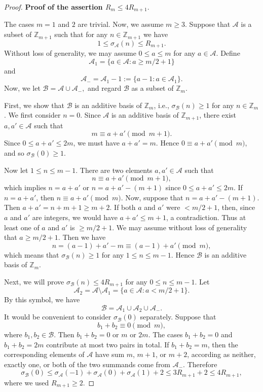 \documentclass[10pt,a4paper]{amsart}
\begin{document}
\begin{proof}
\medskip

{\bf Proof of the assertion $R_{m}\le 4R_{m+1}$}. 

The cases $m=1$ and $2$ are trivial. Now, we assume $m\ge 3$.
Suppose that $\mathcal{A}$ is a subset of $\mathbb{Z}_{m+1}$ such that for any $n\in \mathbb{Z}_{m+1}$ we have
 $$
 1\le \sigma_{\mathcal{A}}(n)\le R_{m+1}.
 $$
Without loss of generality, we may assume $0\le a\le m$ for any $a\in \mathcal{A}$. Define
$$
\mathcal{A}_{1}=\big\{a\in \mathcal{A}: a\ge m/2+1\big\}
$$
and
$$
\mathcal{A}_{-}=\mathcal{A}_{1}-1:=\{a-1: a\in \mathcal{A}_{1}\}.
$$
Now, we let
$
\mathcal{B}=\mathcal{A}\cup \mathcal{A}_{-},
$
and regard $\mathcal{B}$ as a subset of $\mathbb{Z}_{m}$.

First, we show that $\mathcal{B}$ is an additive basis of $\mathbb{Z}_{m}$, i.e., $\sigma_{\mathcal{B}}(n)\ge 1$ for any $n\in \mathbb{Z}_{m}$. We first consider $n=0$. Since $\mathcal A$ is an additive basis of $\mathbb Z_{m+1}$, there exist $a,a'\in\mathcal A$ such that
$$
m\equiv a+a'\pmod{m+1}.
$$
Since $0\le a+a'\le 2m$, we must have $a+a'=m$. Hence $0\equiv a+a'\pmod m$, and so $\sigma_{\mathcal B}(0)\ge1$.

Now let $1\le n\le m-1$. There are two elements $a, a'\in \mathcal{A}$ such that
$$
n\equiv a+a'\pmod{m+1},
$$
which implies $n=a+a'$ or $n=a+a'-(m+1)$ since $0\le a+a'\le 2m$. If $n=a+a'$, then 
$
n\equiv a+a'\pmod{m}.
$
Now, suppose that $n=a+a'-(m+1)$. Then $a+a'=n+m+1\ge m+2$. If both $a$ and $a'$ were $<m/2+1$, then, since $a$ and $a'$ are integers, we would have $a+a'\le m+1$, a contradiction. Thus at least one of $a$ and $a'$ is $\ge m/2+1$. We may assume without loss of generality that $a\ge m/2+1$. Then we have
$$
n=(a-1)+a'-m\equiv (a-1)+a'\pmod{m},
$$
which means that $\sigma_{\mathcal{B}}(n)\ge 1$ for any $1\le n\le m-1$. Hence $\mathcal B$ is an additive basis of $\mathbb Z_m$.

Next, we will prove $\sigma_{\mathcal{B}}(n)\le 4R_{m+1}$ for any $0\le n\le m-1$. Let
$$
\mathcal{A}_{2}=\mathcal{A}\setminus\mathcal{A}_1=\big\{a\in \mathcal{A}: a< m/2+1\big\}.
$$
By this symbol, we have
$$
\mathcal{B}=\mathcal{A}_1\cup \mathcal{A}_{2}\cup\mathcal{A}_{-}.
$$
It would be convenient to consider $\sigma_{\mathcal{B}}(0)$ separately. Suppose that
$$
b_1+b_2\equiv 0\pmod{m},
$$
where $b_1,b_2\in\mathcal B$. Then $b_1+b_2=0$ or $m$ or $2m$. The cases $b_1+b_2=0$ and $b_1+b_2=2m$ contribute at most two pairs in total. If $b_1+b_2=m$, then the corresponding elements of $\mathcal A$ have sum $m$, $m+1$, or $m+2$, according as neither, exactly one, or both of the two summands come from $\mathcal A_-$. Therefore
$$
\sigma_{\mathcal{B}}(0)\le \sigma_{\mathcal{A}}(-1)+\sigma_{\mathcal{A}}(0)+\sigma_{\mathcal{A}}(1)+2\le 3R_{m+1}+2\le 4R_{m+1},
$$
where we used $R_{m+1}\ge 2$.


\end{proof}
\end{document}
